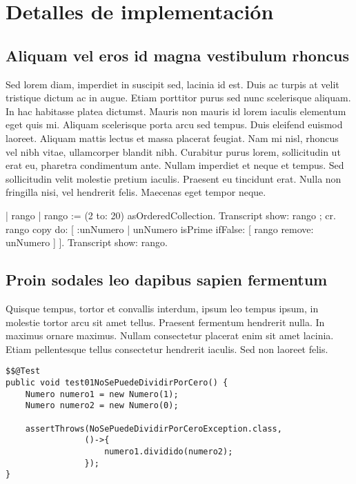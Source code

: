 \documentclass[../informe.tex]{subfiles}
\begin{document}
\section{Detalles de implementación}\label{sec:implementacion}

\subsection{Aliquam vel eros id magna vestibulum rhoncus}
Sed lorem diam, imperdiet in suscipit sed, lacinia id est. Duis ac turpis at velit tristique dictum ac in augue. Etiam porttitor purus sed nunc scelerisque aliquam. In hac habitasse platea dictumst. Mauris non mauris id lorem iaculis elementum eget quis mi. Aliquam scelerisque porta arcu sed tempus. Duis eleifend euismod laoreet. Aliquam mattis lectus et massa placerat feugiat. Nam mi nisl, rhoncus vel nibh vitae, ullamcorper blandit nibh. Curabitur purus lorem, sollicitudin ut erat eu, pharetra condimentum ante. Nullam imperdiet et neque et tempus. Sed sollicitudin velit molestie pretium iaculis. Praesent eu tincidunt erat. Nulla non fringilla nisi, vel hendrerit felis. Maecenas eget tempor neque.

\begin{alternate}[breaklines=true,numbers=left,xleftmargin=5mm]
| rango |
rango := (2 to: 20) asOrderedCollection.
Transcript show: rango ; cr.
rango copy do: [ :unNumero | unNumero isPrime ifFalse: [ rango remove: unNumero ] ].
Transcript show: rango.
\end{alternate}

\subsection{Proin sodales leo dapibus sapien fermentum}
Quisque tempus, tortor et convallis interdum, ipsum leo tempus ipsum, in molestie tortor arcu sit amet tellus. Praesent fermentum hendrerit nulla. In maximus ornare maximus. Nullam consectetur placerat enim sit amet lacinia. Etiam pellentesque tellus consectetur hendrerit iaculis. Sed non laoreet felis.


\begin{lstlisting}[caption=Código XXXX]
$$@Test
public void test01NoSePuedeDividirPorCero() {
    Numero numero1 = new Numero(1);
    Numero numero2 = new Numero(0);
    
    assertThrows(NoSePuedeDividirPorCeroException.class,
                ()->{
                    numero1.dividido(numero2);
                });
}
\end{lstlisting}


\end{document}
